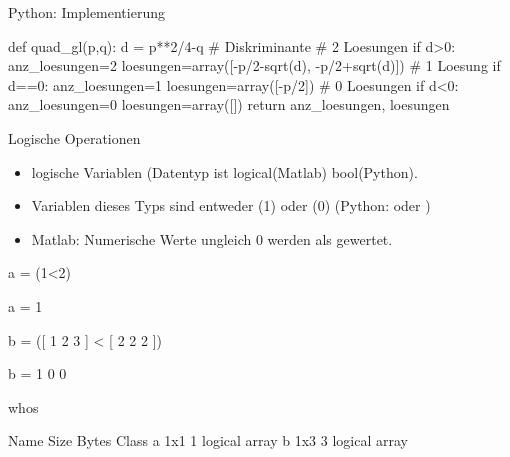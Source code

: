 \documentclass[hyperref={xetex}]{beamer}
\begin{document}
%
%
%
\begin{frame}[fragile]{Python: Implementierung}
\begin{pyin}
def quad_gl(p,q):
    d = p**2/4-q # Diskriminante
    # 2 Loesungen
    if d>0:
        anz_loesungen=2
        loesungen=array([-p/2-sqrt(d), -p/2+sqrt(d)])
    # 1 Loesung
    if d==0:
        anz_loesungen=1
        loesungen=array([-p/2])
    # 0 Loesungen
    if d<0:
        anz_loesungen=0
        loesungen=array([])
    return anz_loesungen, loesungen
\end{pyin}
\end{frame}

%
%
%
\begin{frame}[fragile]{Logische Operationen}
\begin{itemize}
\item logische Variablen (Datentyp ist \alert{logical}(Matlab) \alert{bool}(Python). 
\item Variablen dieses Typs sind entweder  (1) oder
   (0) (Python:  oder )
\item Matlab: Numerische Werte ungleich $0$ werden als  gewertet.
\end{itemize}
\begin{matlabin}
a = (1<2)
\end{matlabin}
\begin{matlab}
a = 1 
\end{matlab}
\begin{matlabin}
b = ([ 1 2 3 ] < [ 2 2 2 ]) 
\end{matlabin}
\begin{matlab}
b =   1     0     0 
\end{matlab}
\begin{matlabin}
whos 
\end{matlabin}
\begin{matlab}
  Name Size Bytes  Class
  a     1x1  1  logical array
  b     1x3  3  logical array 
\end{matlab}
\end{frame}
%
%
%
\end{document}

